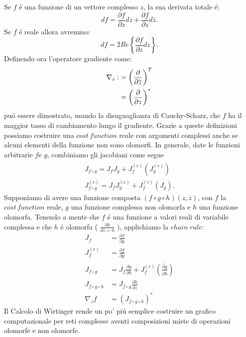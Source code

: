 \documentclass[a4paper,12pt]{report}
\begin{document}
 Se $f$ \'e una funzione di un vettore complesso $z$, la sua derivata totale \'e:
 \begin{equation}
  df=\frac{\partial f}{\partial z}dz+\frac{\partial f}{\partial \overline{z}}d\overline{z}.
 \end{equation}
 Se $f$ \'e reale allora avremmo:
 \begin{equation}
  df=2Re\left \{ \frac{\partial f}{\partial z} dz \right \}.
 \end{equation}
 Definendo ora l'operatore gradiente come:
 \begin{align}
  \nabla_z :&= \left(\frac{\partial}{\partial\overline{z}}\right)^T\\
  &=\left(\frac{\partial}{\partial z}\right)^* \notag
 \end{align}
 pu\'o essere dimostrato, usando la disuguaglianza di Cauchy-Scharz, che $f$ ha il maggior tasso di cambiamento lungo il gradiente. Grazie a queste definizioni possiamo costruire una $cost \, function$ reale con argomenti complessi anche se alcuni elementi della funzione non sono olomorfi. 
 In generale, date le funzioni arbitrarie $f$e $g$, combiniamo gli jacobiani come segue
 \begin{align}
  J_{f\circ g} = J_f J_g + J_f^{\left(c\right)}\overline{\left(J_g^{\left(c\right)}\right)}\\
  J_{f\circ g}^{\left(c\right)} = J_f J_g^{\left(c\right)} + J_f^{\left(c\right)}\overline{\left(J_g\right)}.
 \end{align}
 Supponiamo di avere una funzione composta $\left(f\circ g\circ h\right)\left(z,\overline{z}\right)$, con $f$ la $cost \, function$ reale, $g$ una funzione complessa non olomorfa e $h$ una funzione olomorfa. 
 Tenendo a mente che $f$ \'e una funzione a valori reali di variabile complessa e che $h$ \'e olomorfa ( $\frac{\partial h}{\partial \overline{z} = 0}$ ), applichiamo la $chain \ rule$:
 \begin{align}
  J_f &= \frac{ \partial f}{ \partial g}\\
  J_f^{\left( c\right)} &= \frac{\partial f}{\partial \overline{g}}\\
  J_{f\circ g} &= J_f \frac{\partial g}{\partial h} + J_f^{\left( c\right)} \overline{\left( \frac{\partial g}{\partial \overline{h}}\right) }\\
  J_{f\circ g\circ h} &= J_{f\circ g} \frac{\partial h}{\partial z}\\
  \nabla_z f &= \left( J_{f\circ g\circ h}\right)^*
 \end{align}
 Il Calcolo di Wirtinger rende un po' pi\'u semplice costruire un grafico computazionale per reti complesse aventi composizioni miste di operazioni olomorfe e non olomorfe.
 
\end{document}
